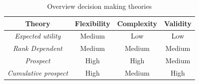 \begin{table}[h!]
    \centering
    \begin{tabular}{||c|c|c|c||}
    \hline 
        \textbf{Theory}  & Flexibility & Complexity & Validity \\
    \hline \hline
         \textit{Expected utility} & Medium & Low & Low \\
    \hline
        \textit{Rank Dependent}  &  Medium & Medium & Medium\\
    \hline 
        \textit{Prospect}  & High & High & Medium\\
    \hline 
        \textit{Cumulative prospect}  & High & Medium & High\\
    \hline 
    \end{tabular}
    \caption{Overview decision making theories}
    \label{tab:overview1}
\end{table}
